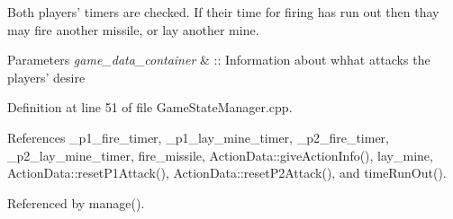 Both players' timers are checked. If their time for firing has run out then thay may fire another missile, or lay another mine. 
\begin{DoxyParams}{Parameters}
{\em game\-\_\-data\-\_\-container} & \-:\-: Information about whhat attacks the players' desire \\
\hline
\end{DoxyParams}


Definition at line 51 of file Game\-State\-Manager.\-cpp.



References \-\_\-p1\-\_\-fire\-\_\-timer, \-\_\-p1\-\_\-lay\-\_\-mine\-\_\-timer, \-\_\-p2\-\_\-fire\-\_\-timer, \-\_\-p2\-\_\-lay\-\_\-mine\-\_\-timer, fire\-\_\-missile, Action\-Data\-::give\-Action\-Info(), lay\-\_\-mine, Action\-Data\-::reset\-P1\-Attack(), Action\-Data\-::reset\-P2\-Attack(), and time\-Run\-Out().



Referenced by manage().


